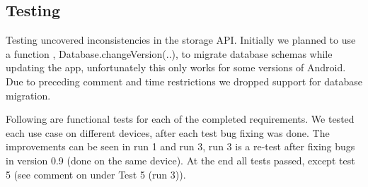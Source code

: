 \subsection{Testing}

Testing uncovered inconsistencies in the storage API. Initially we planned to
use a function , Database.changeVersion(..), to migrate database schemas while
updating the app, unfortunately this only works for some versions of Android.
Due to preceding comment and time restrictions we dropped support for database
migration.

Following are functional tests for each of the completed requirements. We tested
each use case on different devices, after each test bug fixing was done. The
improvements can be seen in run 1 and run 3, run 3 is a re-test after fixing
bugs in version 0.9 (done on the same device). At the end all tests passed,
except test 5 (see comment on under Test 5 (run 3)).





